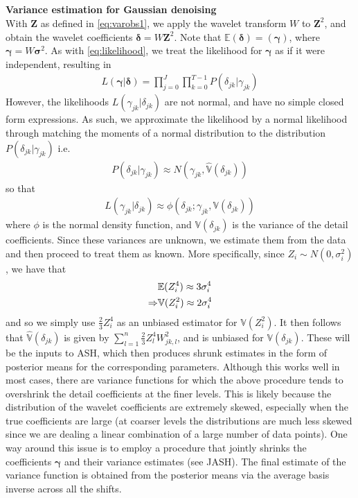 \documentclass[12pt]{article}
\newcommand{\Gg}{\gamma}     \newcommand{\GG}{\Gamma}
\newcommand{\Gd}{\delta}     \newcommand{\GD}{\Delta}
\newcommand{\s}{\sigma}
\begin{document}
\begin{appendices}
\section{}\label{app:var estimation}\bigskip
\textbf{Variance estimation for Gaussian denoising}\bigskip\\
With $\bm{Z}$ as defined in \eqref{eq:varobs1}, we apply the wavelet transform $W$ to $\bm{Z}^2$, and obtain the wavelet coefficients $\bm{\Gd}=W\bm{Z}^2$. Note that $\mathbb{E}(\bm{\Gd})=(\bm{\Gg})$, where $\bm{\Gg}=W\bm{\s}^2$. As with \eqref{eq:likelihood}, we treat the likelihood for $\bm{\Gg}$ as if it were independent, resulting in
\begin{eqnarray}
L(\bm{\Gg}|\bm{\Gd})=\prod_{j=0}^J\prod_{k=0}^{T-1}P(\Gd_{jk}|\Gg_{jk})
\end{eqnarray}
However, the likelihoods $L(\Gg_{jk}|\Gd_{jk})$ are not normal, and have no simple closed form expressions. As such, we approximate the likelihood by a normal likelihood through matching the moments of a normal distribution to the distribution $P(\Gd_{jk}|\Gg_{jk})$ i.e.
\begin{eqnarray}
P(\Gd_{jk}|\Gg_{jk})\approx N(\Gg_{jk},\hat{\mathbb{V}}(\Gd_{jk}))
\end{eqnarray}
so that
\begin{eqnarray}\label{eq:gaus approx}
L(\Gg_{jk}|\Gd_{jk})\approx \phi(\Gd_{jk};\Gg_{jk},\mathbb{V}(\Gd_{jk}))
\end{eqnarray}
where $\phi$ is the normal density function, and $\mathbb{V}(\Gd_{jk})$ is the variance of the detail coefficients. Since these variances are unknown, we estimate them from the data and then proceed to treat them as known. More specifically, since $Z_i\sim N(0,\s_i^2)$, we have that
\begin{eqnarray}
&\mathbb{E}(Z_i^4)\approx 3\s_i^4\notag\\
\label{eq:varvarest}\Rightarrow&\mathbb{V}(Z_i^2)\approx 2\s_i^4
\end{eqnarray}
and so we simply use $\frac{2}{3}Z_i^4$ as an unbiased estimator for $\mathbb{V}(Z_i^2)$. It then follows that $\hat{\mathbb{V}}(\Gd_{jk})$ is given by $\sum_{l=1}^n \frac{2}{3}Z_l^4W_{jk,l}^2$, and is unbiased for $\mathbb{V}(\Gd_{jk})$. These will be the inputs to ASH, which then produces shrunk estimates in the form of posterior means for the corresponding parameters. Although this works well in most cases, there are variance functions for which the above procedure tends to overshrink the detail coefficients at the finer levels. This is likely because the distribution of the wavelet coefficients are extremely skewed, especially when the true coefficients are large (at coarser levels the distributions are much less skewed since we are dealing a linear combination of a large number of data points). One way around this issue is to employ a procedure that jointly shrinks the coefficients $\bm{\Gg}$ and their variance estimates (see JASH). The final estimate of the variance function is obtained from the posterior means via the average basis inverse across all the shifts.\bigskip\\


\end{appendices}
\end{document}
